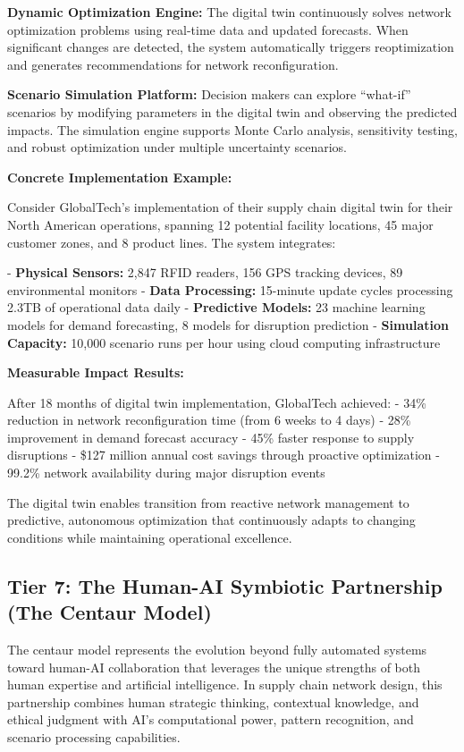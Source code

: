\documentclass{article}
\begin{document}
\textbf{Dynamic Optimization Engine:} The digital twin continuously solves network optimization problems using real-time data and updated forecasts. When significant changes are detected, the system automatically triggers reoptimization and generates recommendations for network reconfiguration.

\textbf{Scenario Simulation Platform:} Decision makers can explore ``what-if'' scenarios by modifying parameters in the digital twin and observing the predicted impacts. The simulation engine supports Monte Carlo analysis, sensitivity testing, and robust optimization under multiple uncertainty scenarios.

\textbf{Concrete Implementation Example:}

Consider GlobalTech's implementation of their supply chain digital twin for their North American operations, spanning 12 potential facility locations, 45 major customer zones, and 8 product lines. The system integrates:

- \textbf{Physical Sensors:} 2,847 RFID readers, 156 GPS tracking devices, 89 environmental monitors
- \textbf{Data Processing:} 15-minute update cycles processing 2.3TB of operational data daily  
- \textbf{Predictive Models:} 23 machine learning models for demand forecasting, 8 models for disruption prediction
- \textbf{Simulation Capacity:} 10,000 scenario runs per hour using cloud computing infrastructure

\textbf{Measurable Impact Results:}

After 18 months of digital twin implementation, GlobalTech achieved:
- 34\% reduction in network reconfiguration time (from 6 weeks to 4 days)
- 28\% improvement in demand forecast accuracy
- 45\% faster response to supply disruptions  
- \$127 million annual cost savings through proactive optimization
- 99.2\% network availability during major disruption events

The digital twin enables transition from reactive network management to predictive, autonomous optimization that continuously adapts to changing conditions while maintaining operational excellence.

\subsection{Tier 7: The Human-AI Symbiotic Partnership (The Centaur Model)}

The centaur model represents the evolution beyond fully automated systems toward human-AI collaboration that leverages the unique strengths of both human expertise and artificial intelligence. In supply chain network design, this partnership combines human strategic thinking, contextual knowledge, and ethical judgment with AI's computational power, pattern recognition, and scenario processing capabilities.
\end{document}
